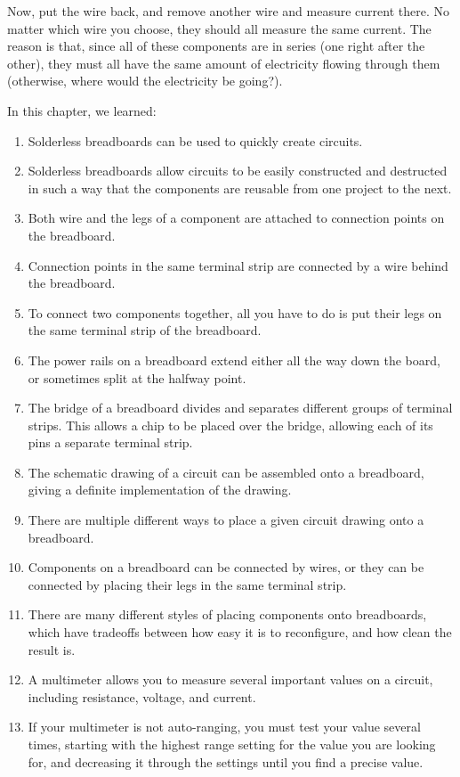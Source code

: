 Now, put the wire back, and remove another wire and measure current there.
No matter which wire you choose, they should all measure the same current.
The reason is that, since all of these components are in series (one right after the other), they must all have the same amount of electricity flowing through them (otherwise, where would the electricity be going?).

\reviewsection

In this chapter, we learned:

\begin{enumerate}
\item Solderless breadboards can be used to quickly create circuits.
\item Solderless breadboards allow circuits to be easily constructed and destructed in such a way that the components are reusable from one project to the next.
\item Both wire and the legs of a component are attached to connection points on the breadboard.
\item Connection points in the same terminal strip are connected by a wire behind the breadboard.
\item To connect two components together, all you have to do is put their legs on the same terminal strip of the breadboard.
\item The power rails on a breadboard extend either all the way down the board, or sometimes split at the halfway point.
\item The bridge of a breadboard divides and separates different groups of terminal strips.  This allows a chip to be placed over the bridge, allowing each of its pins a separate terminal strip.
\item The schematic drawing of a circuit can be assembled onto a breadboard, giving a definite implementation of the drawing.
\item There are multiple different ways to place a given circuit drawing onto a breadboard.
\item Components on a breadboard can be connected by wires, or they can be connected by placing their legs in the same terminal strip.
\item There are many different styles of placing components onto breadboards, which have tradeoffs between how easy it is to reconfigure, and how clean the result is.
\item A multimeter allows you to measure several important values on a circuit, including resistance, voltage, and current.
\item If your multimeter is not auto-ranging, you must test your value several times, starting with the highest range setting for the value you are looking for, and decreasing it through the settings until you find a precise value.

\end{enumerate}
